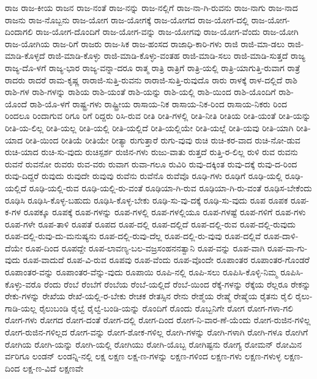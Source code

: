 {ರಾಜ
ರಾಜ-ಕೀಯ
ರಾಜನ
ರಾಜ-ನಂತೆ
ರಾಜ-ನನ್ನು
ರಾಜ-ನಲ್ಲಿಗೆ
ರಾಜ-ನಾ-ಗಿ-ರುವನು
ರಾಜ-ನಾಗು
ರಾಜ-ನಾದ
ರಾಜನು
ರಾಜ-ನೊಬ್ಬನು
ರಾಜ-ಯೋಗ
ರಾಜ-ಯೋಗಕ್ಕೆ
ರಾಜ-ಯೋಗದ
ರಾಜ-ಯೋಗ-ದಲ್ಲಿ
ರಾಜ-ಯೋಗ-ದಿಂದಾಗಲಿ
ರಾಜ-ಯೋಗ-ದೊಂದಿಗೆ
ರಾಜ-ಯೋಗ-ವನ್ನು
ರಾಜ-ಯೋಗವು
ರಾಜ-ಯೋಗ-ವೆಂದು
ರಾಜ-ಯೋಗಿ
ರಾಜ-ಯೋಗಿಯ
ರಾಜ-ರಿಗೆ
ರಾಜರು
ರಾಜ-ಸಿಕ
ರಾಜ-ಹಂಸದ
ರಾಜಾಧಿ-ಕಾರಿ-ಗಳು
ರಾಜಿ
ರಾಜಿ-ಮಾ-ಡಲು
ರಾಜಿ-ಮಾಡಿ-ಕೊಳ್ಳದೆ
ರಾಜಿ-ಮಾಡಿ-ಕೊಳ್ಳು
ರಾಜಿ-ಮಾಡಿ-ಕೊಳ್ಳು-ವಂತಹ
ರಾಜಿ-ಮಾಡಿ-ಸಲು
ರಾಜಿ-ಮಾಡಿ-ಸುತ್ತದೆ
ರಾಜ್ಯ
ರಾಜ್ಯ-ದೊ-ಳಗೆ
ರಾಜ್ಯ-ಭಾರ
ರಾಜ್ಯ-ವನ್ನಾ-ದರೂ
ರಾತ್ಮ
ರಾತ್ರಿ
ರಾತ್ರಿಗೆ
ರಾತ್ರಿ-ಯಲ್ಲಿ
ರಾತ್ರಿ-ಯಾಗುತ್ತಿ-ರುವಾಗ
ರಾತ್ರೆ
ರಾದರು
ರಾದರೆ
ರಾಮ-ಕೃಷ್ಣ
ರಾರಾಜಿ-ಸುತ್ತಿ-ರುವನು
ರಾರಾಜಿ-ಸುತ್ತಿ-ರುವುದೊ
ರಾರು
ರಾಳಕ್ಕೆ
ರಾಳ-ದಲ್ಲಿದೆ
ರಾಶಿ
ರಾಶಿ-ಗಳ
ರಾಶಿ-ಗಳನ್ನು
ರಾಶಿಯ
ರಾಶಿ-ಯಂತೆ
ರಾಶಿ-ಯನ್ನು
ರಾಶಿ-ಯಲ್ಲಿ
ರಾಶಿ-ಯಿಂದ
ರಾಶಿ-ಯೊಂದಿಗೆ
ರಾಶಿ-ಯೊಂದೆ
ರಾಶಿ-ಯೊ-ಳಗೆ
ರಾಷ್ಟ್ರ-ಗಳು
ರಾಷ್ಟ್ರೀಯ
ರಾಸಾಯ-ನಿಕ
ರಾಸಾಯ-ನಿಕ-ರಿಂದ
ರಾಸಾಯ-ನಿಕರು
ರಿಂದ
ರಿಂದಲೂ
ರಿಂದಾಗುವ
ರಿಗೂ
ರಿಗೆ
ರಿದ್ದರು
ರಿಸಿ-ರುವ
ರೀತಿ
ರೀತಿ-ಗಳಲ್ಲಿ
ರೀತಿ-ನೀತಿ
ರೀತಿಯ
ರೀತಿ-ಯಂತೆ
ರೀತಿ-ಯನ್ನು
ರೀತಿ-ಯ-ಲಿಲ್ಲ
ರೀತಿ-ಯಲ್ಲ
ರೀತಿ-ಯಲ್ಲಿ
ರೀತಿ-ಯಲ್ಲಿದೆ
ರೀತಿ-ಯಲ್ಲಿಯೇ
ರೀತಿ-ಯಲ್ಲೆ
ರೀತಿ-ಯವು
ರೀತಿ-ಯಾಗಿ
ರೀತಿ-ಯಾದ
ರೀತಿ-ಯಿಂದ
ರೀತಿಯೆ
ರೀತಿಯೇ
ರೀತ್ಯಾ
ರುಗುತ್ತಾರೆ
ರುಗು-ವುವು
ರುಚಿ
ರುಚಿ-ಕರ-ವಾದ
ರುಚಿ-ನೋ-ಡುವ
ರುಚಿ-ಯಾದ
ರುಚಿ-ಸು-ವುದು
ರುಚಿಸ್ಪರ್ಶ
ರುಜಿನ-ಗಳು
ರುಜು-ವಾತು
ರುತ್ತದೆ
ರುತ್ತಿ-ರ-ಲಿಲ್ಲ
ರುಳಿ
ರುವ
ರುವನು
ರುವನೆ
ರುವನೋ
ರುವರು
ರುವ-ವರು
ರುವಾಗ
ರುವಾ-ಗಲೂ
ರುವಿರಿ
ರುವು-ದಕ್ಕಿಂತ
ರುವು-ದಕ್ಕೆ
ರುವು-ದ-ರಿಂದ
ರುವು-ದಿದ್ದರೆ
ರುವುದು
ರುವುದೇ
ರುವುವು
ರುವೆನು
ರುವೆನೊ
ರುವೆವೊ
ರೂಢಿ-ಗಳು
ರೂಢಿಗೆ
ರೂಢಿ-ಯಲ್ಲಿ
ರೂಢಿ-ಯಲ್ಲಿದೆ
ರೂಢಿ-ಯಲ್ಲಿ-ರುವ
ರೂಢಿ-ಯಲ್ಲಿ-ರು-ವಂತೆ
ರೂಢಿಯಾ-ಗಿ-ರುವ
ರೂಢಿಯಾ-ಗಿ-ರು-ವಂತೆ
ರೂಢಿಸ-ಬೇಕೆಂದು
ರೂಢಿಸಿ
ರೂಢಿಸಿ-ಕೊಳ್ಳ-ಬಹುದು
ರೂಢಿಸಿ-ಕೊಳ್ಳ-ಬೇಕು
ರೂಢಿ-ಸು-ವು-ದಕ್ಕೆ
ರೂಢಿ-ಸು-ವುದು
ರೂಪ
ರೂಪಕ
ರೂಪ-ಕ-ಗಳ
ರೂಪಕ್ಕೂ
ರೂಪಕ್ಕೆ
ರೂಪ-ಗಳನ್ನು
ರೂಪ-ಗಳಲ್ಲಿ
ರೂಪ-ಗಳಲ್ಲಿಯೂ
ರೂಪ-ಗಳಷ್ಟೆ
ರೂಪ-ಗಳಿಗೆ
ರೂಪ-ಗಳು
ರೂಪ-ಗಳೇ
ರೂಪ-ತಾಳಿ
ರೂಪತೆ
ರೂಪದ
ರೂಪ-ದಲ್ಲಿ
ರೂಪ-ದಲ್ಲಿದೆ
ರೂಪ-ದಲ್ಲಿ-ರುವ
ರೂಪ-ದಲ್ಲಿ-ರುವುದು
ರೂಪ-ದಲ್ಲಿ-ರುವು-ದು-ಮನುಷ್ಯನು
ರೂಪ-ದಲ್ಲಿ-ರುವು-ದೆಲ್ಲ
ರೂಪ-ದಲ್ಲಿ-ರು-ವುವು
ರೂಪ-ದಲ್ಲಿವೆ
ರೂಪ-ದಾಳಿ-ದೆಯೇ
ರೂಪ-ದಿಂದ
ರೂಪದ್ದೇ
ರೂಪ-ಲಾವಣ್ಯ-ಬಲ-ವಜ್ರಸಂಹನನತ್ವಾನಿ
ರೂಪ-ವನ್ನು
ರೂಪ-ವಾಗಿ
ರೂಪ-ವಾ-ಗು-ವುದು
ರೂಪ-ವಾದುದೆ
ರೂಪ-ವಿ-ರುವ
ರೂಪವು
ರೂಪ-ವೆಂದು
ರೂಪ-ವೊಂದೇ
ರೂಪಾಂತರ
ರೂಪಾಂತರ-ಗೊಂಡರೆ
ರೂಪಾಂತರ-ವನ್ನು
ರೂಪಾಂತರ-ವೆನ್ನು-ವುದು
ರೂಪಾಯಿ
ರೂಪಿ-ನಲ್ಲಿ
ರೂಪಿ-ಸಲು
ರೂಪಿಸಿ-ಕೊಳ್ಳಿ-ನಿಮ್ಮ
ರೂಪಿಸಿ-ಕೊಳ್ಳು-ವರೊ
ರೆಂದು
ರೆಂಬೆ
ರೆಂಬೆಗೆ
ರೆಂಬೆಯ
ರೆಂಬೆ-ಯಲ್ಲಿದೆ
ರೆಂಬೆ-ಯಿಂದ
ರೆಕ್ಕೆ-ಗಳನ್ನು
ರೆಕ್ಕೆಯ
ರೆಲ್ಲರೂ
ರೇಕನ್ನು
ರೇಕು-ಗಳನ್ನು
ರೇಖೆಯ
ರೇಖೆ-ಯಲ್ಲಿ-ರ-ಬೇಕು
ರೇಚಕ
ರೇತಸ್ಸಿನ
ರೇನು
ರೇಶ್ಮೆಯ
ರೇಷ್ಮೆ
ರೇಷ್ಮೆಯ
ರೈತನು
ರೈಲಿ
ರೈಲು-ಗಾಡಿ-ಯಲ್ಲ
ರೈಲುಬಂಡಿ
ರೈಲ್ವೆ
ರೈಲ್ವೆ-ಬಂಡಿ-ಯನ್ನು
ರೊಂದಿಗೆ
ರೊಂದು
ರೊಬ್ಬನಿಗೇ
ರೋಗ
ರೋಗ-ಗಳಾ-ಗಲಿ
ರೋಗ-ಗಳು
ರೋಗದ
ರೋಗ-ದಂತೆ
ರೋಗ-ದಲ್ಲಿ
ರೋಗ-ದಿಂದ
ರೋಗ-ನಿ-ವಾರ-ಣೆ-ಯೆಂದು
ರೋಗ-ರುಜಿನ-ಗಳಿಲ್ಲ
ರೋಗ-ರುಜಿನ-ಗಳಿಲ್ಲದ
ರೋಗ-ವನ್ನು
ರೋಗ-ಶೋಕ-ಗಳಿಲ್ಲ
ರೋಗಿ-ಗಳನ್ನು
ರೋಗಿ-ಗಳಾಗಿ
ರೋಗಿ-ಗಳೂ
ರೋಗಿಗೆ
ರೋಗಿಯ
ರೋಗಿ-ಯನ್ನು
ರೋಗಿ-ಯಲ್ಲಿ
ರೋಗಿಯು
ರೋಗಿ-ಯೊಬ್ಬ
ರೋಗಿಷ್ಟನು
ರೋಗ್ಯ
ರೋಮನ್
ರೋಮಿನ
ರ್ವರಿಗೂ
ಲಂಡನ್
ಲಂಡನ್ನಿ-ನಲ್ಲಿ
ಲಕ್ಷ
ಲಕ್ಷಣ
ಲಕ್ಷ-ಣ-ಗಳನ್ನು
ಲಕ್ಷಣ-ಗಳಿಂದ
ಲಕ್ಷಣ-ಗಳು
ಲಕ್ಷಣ-ಗಳುಳ್ಳ
ಲಕ್ಷಣ-ದಿಂದ
ಲಕ್ಷ-ಣ-ವಿದೆ
ಲಕ್ಷಣವೇ
}

